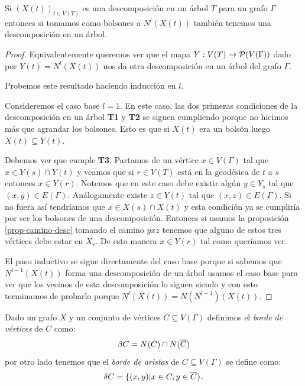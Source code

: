\documentclass[tesis.tex]{subfiles}
\begin{document}
\begin{prop}\label{prop-vecinos-desc}
	Si $(X(t))_{t \in V(T)}$ es una descomposición en un árbol $T$ para un grafo $\Gamma$ entonces si tomamos como bolsones a $N^l(X(t))$ también tenemos una descomposición en un árbol.
\end{prop}
\begin{proof}
	Equivalentemente queremos ver que el mapa $Y: V(T) \to {\cal P}(V(\Gamma))$ dado por $Y(t) = N^l(X(t))$ nos da otra descomposición en un árbol del grafo $\Gamma$.
	
	Probemos este resultado haciendo inducción en $l$.
	
	Consideremos el caso base $l=1$.
	En este caso, las dos primeras condiciones de la descomposición en un árbol \textbf{T1} y \textbf{T2} se siguen cumpliendo porque no hicimos más que agrandar los bolsones. 
	Esto es que si $X(t)$ era un bolsón luego $X(t) \subseteq Y(t)$.
	
	Debemos ver que cumple \textbf{T3}.
	Partamos de un vértice $x \in V(\Gamma)$ tal que $x \in Y(s) \cap Y(t)$ y veamos que si $r \in V(T)$ está en la geodésica de $t$ a $s$ entonces $x \in Y(r)$.
	Notemos que en este caso debe existir algún $y \in Y_s$ tal que $(x,y) \in E(\Gamma)$.
	Análogamente existe $z \in Y(t)$ tal que $(x,z) \in E(\Gamma)$.
	Si no fuera así tendríamos que $x \in X(s) \cap X(t)$ y esta condición ya se cumpliría por ser los bolsones de una descomposición.
	Entonces si usamos la proposición \ref{prop-camino-desc} tomando el camino $yxz$ tenemos que alguno de estos tres vértices debe estar en $X_r$.
	De esta manera $x \in Y(r)$ tal como queríamos ver.
	
	El paso inductivo se sigue directamente del caso base porque si sabemos que $N^{l-1}(X(t))$ forma una descomposición de un árbol usamos el caso base para ver que los vecinos de esta descomposición lo siguen siendo y con esto terminamos de probarlo porque $N^l(X(t)) = N (N^{l-1})(X(t))$.
\end{proof}
\medskip

\begin{deff}
	Dado un grafo $X$ y un conjunto de vértices $C \subseteq V(\Gamma)$ definimos el \emph{borde de vértices} de $C$ como:
	\[
	\beta C =  N(C) \cap N(\overline{ C})
	\] 
	por otro lado tenemos que el \emph{borde de aristas} de $C \subseteq V(\Gamma)$ se define como:	
	\[
	\delta C = \{  (x,y) | x \in C, y \in \overline C    \}.
	\]
\end{deff}
\end{document}
